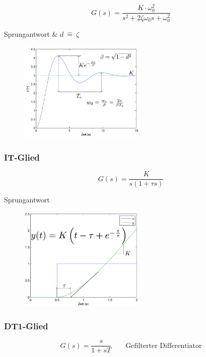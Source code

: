 \documentclass[
  10pt,
  a4paper,
  twocolumn]{article}
\numberwithin{equation}{section}
\begin{document}
\[
G(s)=\frac{K\cdot \omega_0^2}{s^2+2\zeta\omega_0 s+\omega_0^2}
\]

Sprungantwort \& \(d\ \hat{=}\ \zeta\)

\begin{figure}[H]

{\centering \includegraphics[width=6cm,height=4.8cm]{images/paste-19.png}

}

\end{figure}

\hypertarget{it-glied}{%
\subsubsection{IT-Glied}\label{it-glied}}

\[
G(s)=\frac{K}{s(1+\tau s)}
\]

Sprungantwort

\begin{figure}[H]

{\centering \includegraphics[width=6cm,height=\textheight]{images/paste-21.png}

}

\end{figure}

\hypertarget{dt1-glied}{%
\subsubsection{DT1-Glied}\label{dt1-glied}}

\[
G(s)=\frac{s}{1+sT} \qquad \text{Gefilterter Differentiator}
\]
\end{document}

